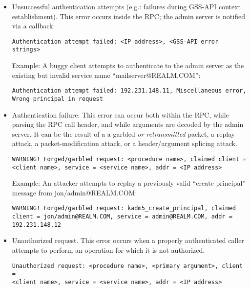 \begin{itemize}
\item Unsuccessful authentication attempts (e.g.: failures during
GSS-API context establishment).  This error occurs inside the RPC; the
admin server is notified via a callback.

\begin{verbatim}
Authentication attempt failed: <IP address>, <GSS-API error strings>
\end{verbatim}

Example:  A buggy client attempts to authenticate to the admin server
as the existing but invalid service name ``mailserver@REALM.COM'':

\begin{verbatim}
Authentication attempt failed: 192.231.148.11, Miscellaneous error,
Wrong principal in request
\end{verbatim}

\item Authentication failure.  This error can occur both within the
RPC, while parsing the RPC call header, and while arguments are
decoded by the admin server.  It can be the result of a a garbled
{\it or retransmitted} packet, a replay attack, a packet-modification
attack, or a header/argument splicing attack.

\begin{verbatim}
WARNING! Forged/garbled request: <procedure name>, claimed client =
<client name>, service = <service name>, addr = <IP address>
\end{verbatim}

Example: An attacker attempts to replay a previously valid ``create
principal'' message from jon/admin@REALM.COM:

\begin{verbatim}
WARNING! Forged/garbled request: kadm5_create_principal, claimed
client = jon/admin@REALM.COM, service = admin@REALM.COM, addr =
192.231.148.12
\end{verbatim}

\item Unauthorized request.  This error occurs when a properly
authenticated caller attempts to perform an operation for which it is
not authorized.

\begin{verbatim}
Unauthorized request: <procedure name>, <primary argument>, client =
<client name>, service = <service name>, addr = <IP address>
\end{verbatim}


\end{itemize}

